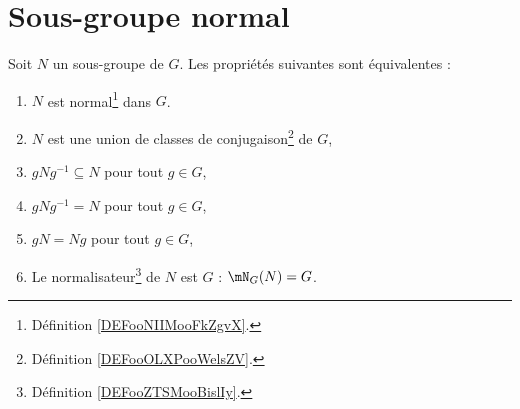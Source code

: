 \section{Sous-groupe normal}

\begin{proposition}\label{propGroupeNormal}
	Soit \( N\) un sous-groupe de \( G\). Les propriétés suivantes sont équivalentes :
	\begin{enumerate}
		\item       \label{ITEMooDYEUooOuKEqQ}
		      \( N\) est normal\footnote{Définition \ref{DEFooNIIMooFkZgvX}.} dans \( G\).
		\item       \label{ITEMooPYTEooZhvrUa}
		      \( N\) est une union de classes de conjugaison\footnote{Définition \ref{DEFooOLXPooWelsZV}.} de \( G\),
		\item       \label{ITEMooJWTLooBRmriQ}
		      \( gNg^{-1}\subseteq N\) pour tout \( g\in G\),
		\item       \label{ITEMooVRZIooAorhRY}
		      \( gNg^{-1}= N\) pour tout \( g\in G\),
		\item       \label{ITEMooJGUOooYshOZa}
		      \( gN=Ng\) pour tout \( g\in G\),
		\item       \label{ITEMooMRYRooZifCCe}
		      Le normalisateur\footnote{Définition \ref{DEFooZTSMooBislIy}.} de \( N\) est \( G\) : \( \mN_G(N)=G\).
	\end{enumerate}
\end{proposition}

